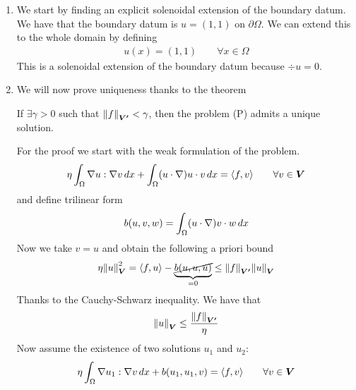 \begin{enumerate}
    \item We start by finding an explicit solenoidal extension of the boundary datum. We
          have that the boundary datum is \(u = (1,1)\) on \(\partial\Omega\). We can
          extend this to the whole domain by defining
          \[
              \begin{split}
                  u(x) = (1,1) \qquad \forall x \in \Omega
              \end{split}
          \]
          This is a solenoidal extension of the boundary datum because \(\div u = 0\).
    \item We will now prove uniqueness thanks to the theorem
          \begin{remark}
              If \(\exists \gamma > 0\) such that \(\norm{f}_{\bm{V'}} < \gamma\), then the problem (P) admits a unique solution.
          \end{remark}
          For the proof we start with the weak formulation of the problem.
          \[
              \begin{split}
                  \eta \int_\Omega \nabla u : \nabla v \, dx + \int_\Omega (u \cdot \nabla) u \cdot v \, dx = \langle f, v \rangle \qquad \forall v \in \bm{V}
              \end{split}
          \]
          and define trilinear form
          \[
              \begin{split}
                  b(u, v, w) = \int_\Omega (u \cdot \nabla) v \cdot w \, dx
              \end{split}
          \]
          Now we take \(v = u\) and obtain the following a priori bound
          \[
              \begin{split}
                  \eta \norm{u}_{\bm{V}}^2 = \langle f, u \rangle - \underbrace{\cancel{b(u, u, u)}}_{=0} \leq \norm{f}_{\bm{V'}} \norm{u}_{\bm{V}}
              \end{split}
          \]
          Thanks to the Cauchy-Schwarz inequality. We have that
          \[
              \begin{split}
                  \norm{u}_{\bm{V}} \leq \frac{\norm{f}_{\bm{V'}}}{\eta}
              \end{split}
          \]
          Now assume the existence of two solutions \(u_1\) and \(u_2\):
          \begin{align*}
              \eta \int_\Omega \grad u_1 : \grad v \, dx + b(u_1, u_1, v) & = \langle f, v \rangle \qquad \forall v \in \bm{V} \\

\end{align*}
\end{enumerate}
